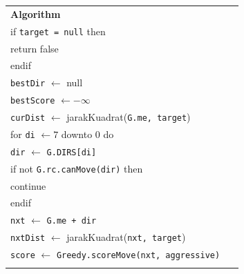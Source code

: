 \documentclass{article}
\newenvironment{pseudobox}
{
\centering
\begin{longtable}{|p{0.94\linewidth}|}
\hline
}
{
\\ \hline
\end{longtable}
\vspace{0.05cm}
}
\begin{document}
\begin{enumerate}[label=\alph*.]
\begin{enumerate}[label=\alph*.]
\begin{pseudobox}
\textbf{Algorithm} \\
\hspace*{1.5em}if \texttt{target = null} then \\
\hspace*{3em}return false \\
\hspace*{1.5em}endif \\

\hspace*{1.5em}\texttt{bestDir} $\leftarrow$ null \\
\hspace*{1.5em}\texttt{bestScore} $\leftarrow -\infty$ \\
\hspace*{1.5em}\texttt{curDist} $\leftarrow$ jarakKuadrat(\texttt{G.me, target}) \\

\hspace*{1.5em}for \texttt{di} $\leftarrow 7$ downto 0 do \\
\hspace*{3em}\texttt{dir} $\leftarrow$ \texttt{G.DIRS[di]} \\
\hspace*{3em}if not \texttt{G.rc.canMove(dir)} then \\
\hspace*{4.5em}continue \\
\hspace*{3em}endif \\

\hspace*{3em}\texttt{nxt} $\leftarrow$ \texttt{G.me + dir} \\
\hspace*{3em}\texttt{nxtDist} $\leftarrow$ jarakKuadrat(\texttt{nxt, target}) \\
\hspace*{3em}\texttt{score} $\leftarrow$ \texttt{Greedy.scoreMove(nxt, aggressive)} \\


\end{pseudobox}
\end{enumerate}
\end{enumerate}
\end{document}
